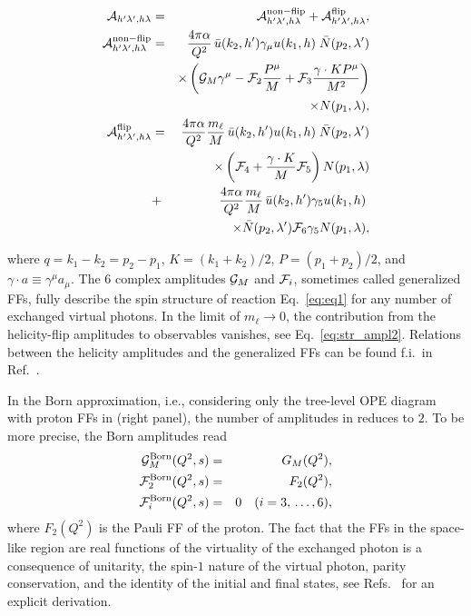 \begin{eqnarray}
\label{eq:str_ampl}
{\mathcal A}_{h^\prime \lambda^\prime, h \lambda}  &=&  {\mathcal A}_{h^\prime \lambda^\prime, h \lambda}^{\mathrm{non-flip}}  +  {\mathcal A}_{h^\prime \lambda^\prime, h \lambda}^{\mathrm{flip}},\\
{\mathcal A}_{h^\prime \lambda^\prime, h \lambda}^{\mathrm{non-flip}} &=&  \frac{4\pi \alpha}{Q^2}\, \bar{u}(k_2,h^\prime) \gamma_\mu u(k_1,h)\;  \bar{N}(p_2,\lambda^\prime)\nonumber\\&& \times\left( {\cal G}_M \gamma^\mu -   {\cal F}_2 \frac{P^{\mu}}{M} +  {\cal F}_3 \frac{\gamma \cdot K P^{\mu}}{M^2} \right)\nonumber\\ &&\times N(p_1,\lambda),  \label{eq:str_ampl1}  \\
 {\mathcal A}_{h^\prime \lambda^\prime, h \lambda}^{\mathrm{flip}} &=& \frac{4\pi \alpha}{Q^2} \frac{m_\ell}{M}\, \bar{u}(k_2,h^\prime) u(k_1,h) \; \bar{N}(p_2,\lambda^\prime)\nonumber\\ &&\times\left( {\cal F}_4  +  \frac{\gamma \cdot K}{M} {\cal F}_5  \right) N(p_1,\lambda)  \nonumber \\
 &+ &\frac{4\pi \alpha}{Q^2} \frac{m_\ell}{M}\, \bar{u}(k_2,h^\prime) \gamma_5 u(k_1,h) \;\nonumber\\ &&\times\bar{N}(p_2,\lambda^\prime) {\cal F}_6 \gamma_5 N(p_1,\lambda), \label{eq:str_ampl2}
\end{eqnarray}

where $q=k_1-k_2=p_2-p_1$, $K=(k_1+k_2)/2$,
$P=(p_1+p_2)/2$, and $\gamma \cdot a \equiv \gamma^\mu a_\mu$.  
The $6$ complex amplitudes ${\cal G}_M$ and ${\cal F}_i$, sometimes called generalized FFs, fully describe the
spin structure of reaction Eq.~\ref{eq:eq1} for any
number of exchanged virtual photons. In the limit of $m_\ell \to 0$, the contribution from the helicity-flip amplitudes to observables vanishes, see Eq.~\ref{eq:str_ampl2}. Relations between the helicity amplitudes and the generalized FFs can be found f.i.\ in Ref.~\cite{Tomalak:2014dja}.

In the Born approximation, i.e., considering only the tree-level OPE diagram with proton FFs in  (right panel), the number of amplitudes in  reduces to $2$. To be more precise, the Born amplitudes read
\begin{eqnarray}
{\cal G}_M^\text{Born}(Q^2, s)&=&G_{M}(Q^2), \\
{\cal F}_2^\text{Born}(Q^2,
s)&=&F_{2}(Q^2),  \\
{\cal F}_i^\text{Born}(Q^2, s)&=&0 \quad (i=3,\, \dots, 6),
\label{eq:eq6}
\end{eqnarray}
where $F_{2}(Q^2)$ is the Pauli
 FF of the proton. The fact that the FFs  in the space-like region are 
real functions of the virtuality of the exchanged photon is a consequence of unitarity, the spin-$1$ nature of the
virtual photon, parity conservation, and the identity of the initial
and final states, see Refs.~\cite{Halzen:1984mc,Tomasi-Gustafsson:2011sda}
for an explicit derivation.


